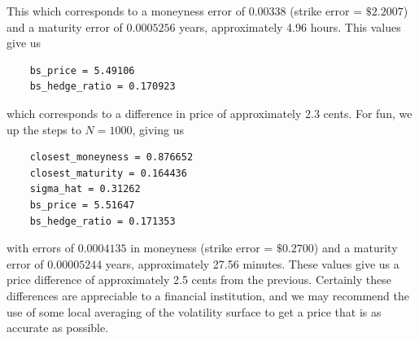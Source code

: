 \documentclass[11pt]{article}
\makeatletter
\let\oldappendix\appendix %
\renewcommand\appendix{%
    \oldappendix
    \newcommand{\section@cntformat}{\appendixname~\thesection\quad}
}
\newlength\tindent
\renewcommand{\indent}{\hspace*{\tindent}}
\makeatother
\begin{document}
\indent This which corresponds to a moneyness error of $0.00338$ (strike error = $\$2.2007$) and a maturity error of $0.0005256$ years, approximately 4.96 hours. This values give us \\

\begin{lstlisting}
	bs_price = 5.49106
	bs_hedge_ratio = 0.170923
\end{lstlisting} 

which corresponds to a difference in price of approximately 2.3 cents. For fun, we up the steps to $N = 1000$, giving us \\

\begin{lstlisting}
	closest_moneyness = 0.876652	
	closest_maturity = 0.164436
	sigma_hat = 0.31262
	bs_price = 5.51647
	bs_hedge_ratio = 0.171353
\end{lstlisting} 

with errors of $0.0004135$ in moneyness (strike error = $\$0.2700$) and a maturity error of $0.00005244$ years, approximately 27.56 minutes. These values give us a price difference of approximately 2.5 cents from the previous. Certainly these differences are appreciable to a financial institution, and we may recommend the use of some local averaging of the volatility surface to get a price that is as accurate as possible.

\appendix

\newpage
\end{document}

